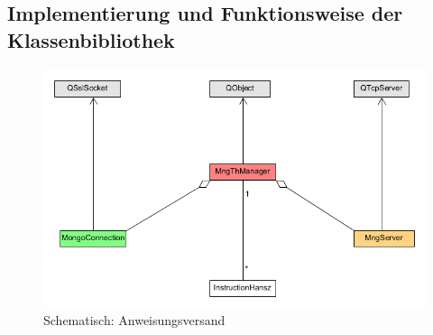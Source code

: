 \subsection{Implementierung und Funktionsweise der Klassenbibliothek}

\begin{figure}
\includegraphics[scale=.4]{classDiagInstr}
\caption{Schematisch: Anweisungsversand}
\label{inst_d}
\end{figure}

